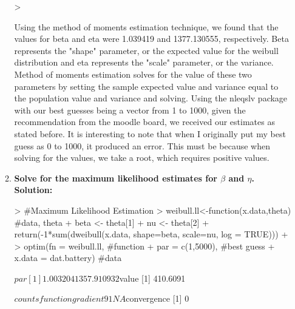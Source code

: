 \documentclass{article}
\begin{document}
\begin{enumerate}
\begin{enumerate}
\begin{Schunk}
\begin{Sinput}
> 
\end{Sinput}
\end{Schunk}
\citep{nleqslv}
\newline
Using the method of moments estimation technique, we found that the values for beta and eta were 1.039419 and 1377.130555, respectively. Beta represents the "shape" parameter, or the expected value for the weibull distribution and eta represents the "scale" parameter, or the variance. Method of moments estimation solves for the value of these two parameters by setting the sample expected value and variance equal to the population value and variance and solving. Using the nleqslv package with our best guesses being a vector from 1 to 1000, given the recommendation from the moodle board, we received our estimates as stated before. It is interesting to note that when I originally put my best guess as 0 to 1000, it produced an error. This must be because when solving for the values, we take a root, which requires positive values. 
\newline
  \item \textbf{Solve for the maximum likelihood estimates for $\beta$ and $\eta$.}
  \newline
  \textbf{Solution:}
  \newline
\begin{Schunk}
\begin{Sinput}
> #Maximum Likelihood Estimation
> weibull.ll<-function(x.data,theta){ #data, theta
+   beta <- theta[1]
+   nu <- theta[2]
+   return(-1*sum(dweibull(x.data, shape=beta, scale=nu, log = TRUE)))
+ }
> optim(fn = weibull.ll, #function
+       par = c(1,5000), #best guess
+       x.data = dat.battery) #data
\end{Sinput}
\begin{Soutput}
$par
[1]    1.003204 1357.910932

$value
[1] 410.6091

$counts
function gradient 
      91       NA 

$convergence
[1] 0


\end{Soutput}
\end{Schunk}
\end{enumerate}
\end{enumerate}
\end{document}

